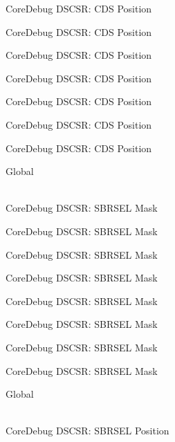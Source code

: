 \begin{DoxyRefList}
\label{deprecated__deprecated000147}%
%
Core\+Debug DSCSR\+: CDS Position 

\label{deprecated__deprecated000223}%
%
Core\+Debug DSCSR\+: CDS Position 

\label{deprecated__deprecated000286}%
%
Core\+Debug DSCSR\+: CDS Position 

\label{deprecated__deprecated000365}%
%
Core\+Debug DSCSR\+: CDS Position 

\label{deprecated__deprecated000441}%
%
Core\+Debug DSCSR\+: CDS Position 

\label{deprecated__deprecated000544}%
%
Core\+Debug DSCSR\+: CDS Position 

\label{deprecated__deprecated000646}%
%
Core\+Debug DSCSR\+: CDS Position  
\item[{\parbox[t]{\linewidth}{Global \doxylink{group___c_m_s_i_s___s_c_b_gaaffe28a24f05446e55ba3d75bb6f4cd0}{Core\+Debug\+\_\+\+DSCSR\+\_\+\+SBRSEL\+\_\+\+Msk} }}]\hfill \\
\label{deprecated__deprecated000096}%
%
Core\+Debug DSCSR\+: SBRSEL Mask 

\label{deprecated__deprecated000150}%
%
Core\+Debug DSCSR\+: SBRSEL Mask 

\label{deprecated__deprecated000226}%
%
Core\+Debug DSCSR\+: SBRSEL Mask 

\label{deprecated__deprecated000289}%
%
Core\+Debug DSCSR\+: SBRSEL Mask 

\label{deprecated__deprecated000368}%
%
Core\+Debug DSCSR\+: SBRSEL Mask 

\label{deprecated__deprecated000444}%
%
Core\+Debug DSCSR\+: SBRSEL Mask 

\label{deprecated__deprecated000547}%
%
Core\+Debug DSCSR\+: SBRSEL Mask 

\label{deprecated__deprecated000649}%
%
Core\+Debug DSCSR\+: SBRSEL Mask  
\item[{\parbox[t]{\linewidth}{Global \doxylink{group___c_m_s_i_s___s_c_b_ga7450603163415ab4d4e4a7a767879eae}{Core\+Debug\+\_\+\+DSCSR\+\_\+\+SBRSEL\+\_\+\+Pos} }}]\hfill \\
\label{deprecated__deprecated000095}%
%
Core\+Debug DSCSR\+: SBRSEL Position 


\end{DoxyRefList}
